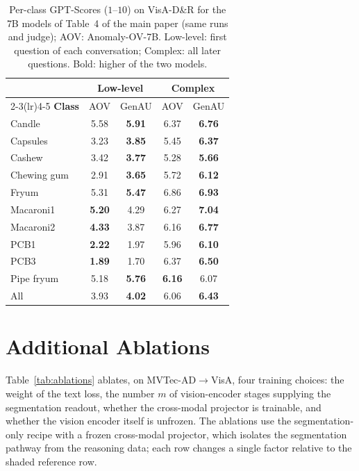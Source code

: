 \begin{table}[t]
\centering
\small
\setlength{\tabcolsep}{4pt}
\caption{Per-class GPT-Scores ($1$--$10$) on VisA-D\&R for the 7B models of Table~4 of the main paper (same runs and judge); AOV: Anomaly-OV-7B. Low-level: first question of each conversation; Complex: all later questions. Bold: higher of the two models.}
\label{tab:dr_perclass}
\begin{tabular}{@{}l|cc|cc@{}}
\toprule
 & \multicolumn{2}{c|}{\textbf{Low-level}} & \multicolumn{2}{c}{\textbf{Complex}} \\
\cmidrule(lr){2-3}\cmidrule(lr){4-5}
\textbf{Class} & AOV & GenAU & AOV & GenAU \\
\midrule
Candle      & 5.58 & \textbf{5.91} & 6.37 & \textbf{6.76} \\
Capsules    & 3.23 & \textbf{3.85} & 5.45 & \textbf{6.37} \\
Cashew      & 3.42 & \textbf{3.77} & 5.28 & \textbf{5.66} \\
Chewing gum & 2.91 & \textbf{3.65} & 5.72 & \textbf{6.12} \\
Fryum       & 5.31 & \textbf{5.47} & 6.86 & \textbf{6.93} \\
Macaroni1   & \textbf{5.20} & 4.29 & 6.27 & \textbf{7.04} \\
Macaroni2   & \textbf{4.33} & 3.87 & 6.16 & \textbf{6.77} \\
PCB1        & \textbf{2.22} & 1.97 & 5.96 & \textbf{6.10} \\
PCB3        & \textbf{1.89} & 1.70 & 6.37 & \textbf{6.50} \\
Pipe fryum  & 5.18 & \textbf{5.76} & \textbf{6.16} & 6.07 \\
\midrule
All         & 3.93 & \textbf{4.02} & 6.06 & \textbf{6.43} \\
\bottomrule
\end{tabular}
\end{table}

\section{Additional Ablations}
\label{app:ablation}
Table~\ref{tab:ablations} ablates, on MVTec-AD$\rightarrow$VisA, four training choices: the weight of the text loss, the number $m$ of vision-encoder stages supplying the segmentation readout, whether the cross-modal projector is trainable, and whether the vision encoder itself is unfrozen. The ablations use the segmentation-only recipe with a frozen cross-modal projector, which isolates the segmentation pathway from the reasoning data; each row changes a single factor relative to the shaded reference row.

